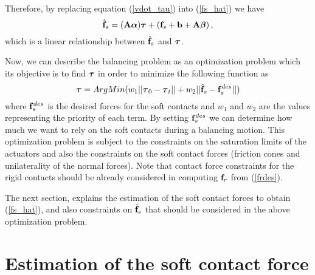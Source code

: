 \documentclass[a4paper, 11pt]{article}
\begin{document}
Therefore, by replacing equation (\ref{vdot_tau}) into (\ref{fs_hat}) we have
%
\begin{equation}
  \hat{\mathbf{f}}_s = (\mathbf{A} \boldsymbol{\alpha}) \boldsymbol{\tau} + (\mathbf{f}_s + \mathbf{b} + \mathbf{A} \boldsymbol{\beta}) \, ,
\end{equation}
%
which is a linear relationship between $\hat{\mathbf{f}}_s$ and $\boldsymbol{\tau}$.

Now, we can describe the balancing problem as an optimization problem which
its objective is to find $\boldsymbol{\tau}$ in order to minimize the following function
as
%
\begin{equation}
  \boldsymbol{\tau} = ArgMin ( w_1 ||\boldsymbol{\tau}_0 - \boldsymbol{\tau}_t|| + w_2||\hat{\mathbf{f}}_s -
  \mathbf{f}_s^{des}||)
\end{equation}
%
where $\mathbf{f}_s^{des}$ is the desired forces for the soft contacts and $w_1$ and
$w_2$ are the values representing the priority of each term.  By setting
$\mathbf{f}_s^{des}$ we can determine how much we want to rely on the soft contacts
during a balancing motion.  This optimization problem is subject to the
constraints on the saturation limits of the actuators and also the constraints
on the soft contact forces (friction cones and unilaterality of the normal
forces).  Note that contact force constraints for the rigid contacts should be
already considered in computing $\mathbf{f}_r$ from (\ref{frdes}).

The next section, explains the estimation of the soft contact forces to obtain
(\ref{fs_hat}), and also constraints on $\hat{\mathbf{f}}_s$ that should be
considered in the above optimization problem.


\section{Estimation of the soft contact force}
\end{document}
